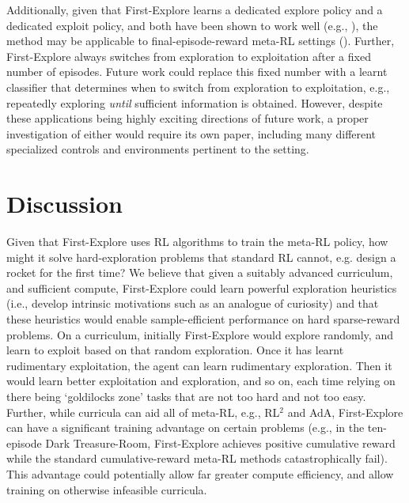 \documentclass{article}
\begin{document}
Additionally, given that First-Explore learns a dedicated explore policy and a dedicated exploit policy, and both have been shown to work well (e.g., ), the method may be applicable to final-episode-reward meta-RL settings (). Further, First-Explore always switches from exploration to exploitation after a fixed number of episodes. Future work could replace this fixed number with a learnt classifier that determines when to switch from exploration to exploitation, e.g., repeatedly exploring \emph{until} sufficient information is obtained. However, despite these applications being highly exciting directions of future work, a proper investigation of either would require its own paper, including many different specialized controls and environments pertinent to the setting.
\FloatBarrier
\section{Discussion}
Given that First-Explore uses RL algorithms to train the meta-RL policy, how might it solve hard-exploration problems that standard RL cannot, e.g. design a rocket for the first time? We believe that given a suitably advanced curriculum, and sufficient compute, First-Explore could learn powerful exploration heuristics (i.e., develop intrinsic motivations such as an analogue of curiosity) and that these heuristics would enable sample-efficient performance on hard sparse-reward problems. On a curriculum, initially First-Explore would explore randomly, and learn to exploit based on that random exploration. Once it has learnt rudimentary exploitation, the agent can learn rudimentary exploration. Then it would learn better exploitation and exploration, and so on, each time relying on there being `goldilocks zone' tasks \citep{POET} that are not too hard and not too easy.
Further, while curricula can aid all of meta-RL, e.g., RL\(^2\) and AdA, First-Explore can have a significant training advantage on certain problems (e.g., in the ten-episode Dark Treasure-Room, First-Explore achieves positive cumulative reward while the standard cumulative-reward meta-RL methods catastrophically fail). This advantage could potentially allow far greater compute efficiency, and allow training on otherwise infeasible curricula.
\end{document}
